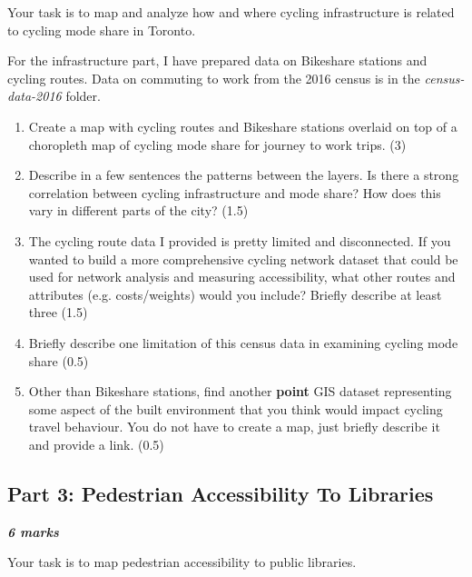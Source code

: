 \documentclass[11pt]{article}
\begin{document}
	Your task is to map and analyze how and where cycling infrastructure is related to cycling mode share in Toronto. 

	For the infrastructure part, I have prepared data on Bikeshare stations and cycling routes. Data on commuting to work from the 2016 census is in the \textit{census-data-2016} folder.

	\begin{enumerate}
			
		\item Create a map with cycling routes and Bikeshare stations overlaid on top of a choropleth map of cycling mode share for journey to work trips. (3)
		
		\item Describe in a few sentences the patterns between the layers. Is there a strong correlation between cycling infrastructure and mode share? How does this vary in different parts of the city? (1.5)
		
		\item The cycling route data I provided is pretty limited and disconnected. If you wanted to build a more comprehensive cycling network dataset that could be used for network analysis and measuring accessibility, what other routes and attributes (e.g. costs/weights) would you include?  Briefly describe at least three (1.5)
				
		\item Briefly describe one limitation of this census data in examining cycling mode share (0.5)
		
		\item Other than Bikeshare stations, find another \textbf{point} GIS dataset representing some aspect of the built environment that you think would impact cycling travel behaviour. You do not have to create a map, just briefly describe it and provide a link. (0.5)
		
	\end{enumerate}
	
	
	
	
	
	
	\subsection*{Part 3: Pedestrian Accessibility To Libraries} 
	
	\vspace{-2mm}
	\textbf{\textit{6 marks}}
	
	Your task is to map pedestrian accessibility to public libraries. 
	
\end{document}
